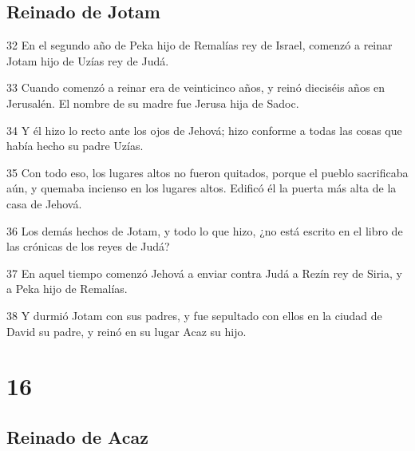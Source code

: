 \section*{Reinado de Jotam}

\par 32 En el segundo año de Peka hijo de Remalías rey de Israel, comenzó a reinar Jotam hijo de Uzías rey de Judá.
\par 33 Cuando comenzó a reinar era de veinticinco años, y reinó dieciséis años en Jerusalén. El nombre de su madre fue Jerusa hija de Sadoc.
\par 34 Y él hizo lo recto ante los ojos de Jehová; hizo conforme a todas las cosas que había hecho su padre Uzías.
\par 35 Con todo eso, los lugares altos no fueron quitados, porque el pueblo sacrificaba aún, y quemaba incienso en los lugares altos. Edificó él la puerta más alta de la casa de Jehová.
\par 36 Los demás hechos de Jotam, y todo lo que hizo, ¿no está escrito en el libro de las crónicas de los reyes de Judá?
\par 37 En aquel tiempo comenzó Jehová a enviar contra Judá a Rezín rey de Siria, y a Peka hijo de Remalías.
\par 38 Y durmió Jotam con sus padres, y fue sepultado con ellos en la ciudad de David su padre, y reinó en su lugar Acaz su hijo.

\chapter{16}

\section*{Reinado de Acaz}

